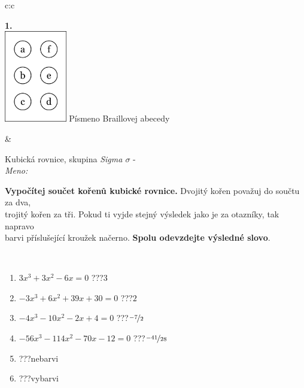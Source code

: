 \documentclass[10pt]{report}
\begin{document}
\begin{tabular}{c:c}
\begin{minipage}[c][104.5mm][t]{0.5\linewidth}
\begin{center}
\begin{minipage}{0.20\linewidth}
\begin{center}
{\Huge\bfseries 1.} \\[2mm]
\includegraphics[height=40mm]{../images/braille.png}
{\small Písmeno Braillovej abecedy}
\end{center}
\end{minipage}
\end{center}
\end{minipage}
&
\begin{minipage}[c][104.5mm][t]{0.5\linewidth}
\begin{center}
\vspace{7mm}
{\huge Kubická rovnice, skupina \textit{Sigma $\sigma$} -}\\[5mm]
\textit{Meno:}\phantom{xxxxxxxxxxxxxxxxxxxxxxxxxxxxxxxxxxxxxxxxxxxxxxxxxxxxxxxxxxxxxxxxx}\\[5mm]
\begin{minipage}{0.95\linewidth}
\textbf{Vypočítej součet kořenů kubické rovnice.} Dvojitý kořen považuj do součtu za dva,\\trojitý kořen za tři. Pokud ti vyjde stejný výsledek jako je za otazníky, tak napravo\\barvi příslušející kroužek načerno. \textbf{Spolu odevzdejte výsledné slovo}.
\end{minipage}
\\[1mm]
\begin{minipage}{0.79\linewidth}
\begin{center}
\begin{varwidth}{\linewidth}
\begin{enumerate}
\Large
\item $3x^3+3x^2-6x=0$\quad \dotfill\; ???\;\dotfill \quad $3$
\item $-3x^3+6x^2+39x+30=0$\quad \dotfill\; ???\;\dotfill \quad $2$
\item $-4x^3-10x^2-2x+4=0$\quad \dotfill\; ???\;\dotfill \quad $\nicefrac{-7}{2}$
\item $-56x^3-114x^2-70x-12=0$\quad \dotfill\; ???\;\dotfill \quad $\nicefrac{-41}{28}$
\item \quad \dotfill\; ???\;\dotfill \quad nebarvi
\item \quad \dotfill\; ???\;\dotfill \quad vybarvi

\end{enumerate}
\end{varwidth}
\end{center}
\end{minipage}
\end{center}
\end{minipage}
\end{tabular}
\end{document}
